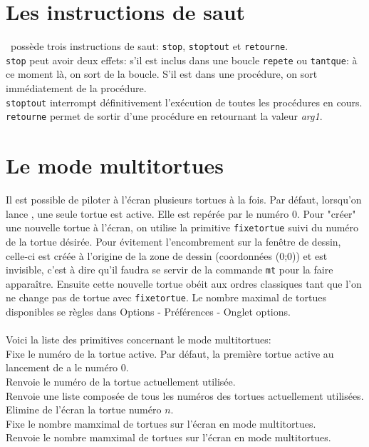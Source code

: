 \section{Les instructions de saut}
\noindent \xlogo\ possède trois instructions de saut: \texttt{stop}, \texttt{stoptout} et \texttt{retourne}.\\
\texttt{stop} peut avoir deux effets: s'il est inclus dans une boucle \texttt{repete} ou \texttt{tantque}: à ce moment là, on sort de la boucle. S'il est dans une procédure, on sort immédiatement de la procédure.\\
\texttt{stoptout} interrompt définitivement l'exécution de toutes les procédures en cours.\\
\texttt{retourne} permet de sortir d'une procédure en retournant la valeur \textit{arg1}.

\section{Le mode multitortues}
Il est possible de piloter à l'écran plusieurs tortues à la fois. Par défaut, lorsqu'on lance \xlogo, une seule tortue est active. Elle est repérée par le numéro 0. Pour "créer" une nouvelle tortue à l'écran, on utilise la primitive \texttt{fixetortue} suivi du numéro de la tortue désirée. Pour évitement l'encombrement sur la fenêtre de dessin, celle-ci est créée à l'origine de la zone de dessin (coordonnées (0;0)) et est invisible, c'est à dire qu'il faudra se servir de la commande \texttt{mt} pour la faire apparaître. Ensuite cette nouvelle tortue obéit aux ordres classiques tant que l'on ne change pas de tortue avec \texttt{fixetortue}. Le nombre maximal de tortues disponibles se règles dans Options - Préférences - Onglet options.\\
\\
Voici la liste des primitives concernant le mode multitortues:\\
Fixe le numéro de la tortue active. Par défaut, la première tortue active au lancement de \xlogo a le numéro 0.\\
Renvoie le numéro de la tortue actuellement utilisée.\\
Renvoie une liste composée de tous les numéros des tortues actuellement utilisées.\\
Elimine de l'écran la tortue numéro $n$.\\
Fixe le nombre mamximal de tortues sur l'écran en mode multitortues.\\
Renvoie le nombre mamximal de tortues sur l'écran en mode multitortues.
